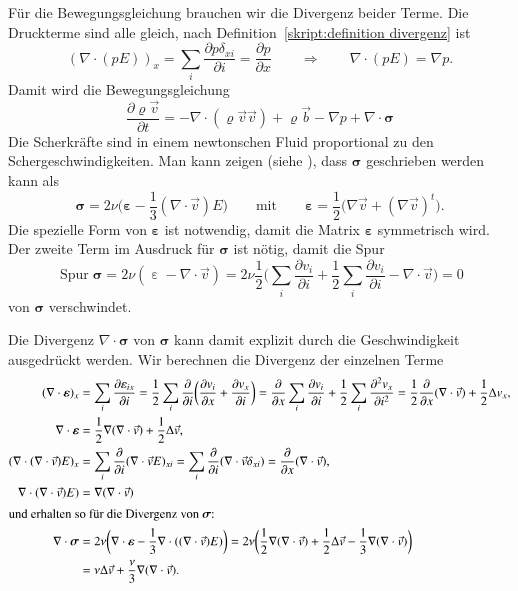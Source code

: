 Für die Bewegungsgleichung brauchen wir die Divergenz beider Terme.
Die Druckterme sind alle gleich, nach
Definition~\ref{skript:definition divergenz} ist
\[
(\nabla\cdot(pE))_x
=
\sum_i
\frac{\partial p\delta_{xi}}{\partial i}
=
\frac{\partial p}{\partial x}
\qquad\Rightarrow\qquad
\nabla\cdot(pE)
=
\nabla p.
\]
Damit wird die Bewegungsgleichung 
\begin{equation}
\frac{\partial \varrho\vec{v}}{\partial t}
=
-\nabla\cdot(\varrho\vec{v}\vec{v})
+\varrho\vec b
-\nabla p
+\nabla\cdot\bm{\sigma}
\label{skript:navier-stokes2}
\end{equation}
Die Scherkräfte sind in einem newtonschen Fluid proportional zu
den Schergeschwindigkeiten.
Man kann zeigen (siehe \cite[p.~172]{skript:kaperengler}), dass $\bm{\sigma}$
geschrieben werden kann als
\[
\bm{\sigma}
=
2\nu\biggl(\bm{\varepsilon} - \frac13(\nabla\cdot\vec{v})E\biggr)
\qquad\text{mit}\qquad
\bm{\varepsilon}=\frac12\bigl(\nabla\vec{v}+(\nabla\vec{v})^t\bigr).
\]
Die spezielle Form von $\bm{\varepsilon}$ ist notwendig, damit die Matrix
$\bm{\varepsilon}$ symmetrisch wird.
Der zweite Term im Ausdruck für $\bm{\sigma}$ ist nötig, damit die Spur
\[
\operatorname{Spur}{\bm{\sigma}}
=
2\nu(\operatorname{\varepsilon} - \nabla\cdot\vec{v})
=
2\nu
\frac12
\biggl(
\sum_i \frac{\partial v_i}{\partial i}
+
\frac12
\sum_i \frac{\partial v_i}{\partial i}
-
\nabla\cdot\vec{v}
\biggr)
=
0
\]
von $\bm{\sigma}$ verschwindet.

Die Divergenz $\nabla\cdot\bm{\sigma}$ von $\bm{\sigma}$ kann damit explizit
durch die Geschwindigkeit ausgedrückt werden.
Wir berechnen die Divergenz der einzelnen Terme
\begin{align}
(\nabla\cdot\bm{\varepsilon})_x
&=
\sum_i\frac{\partial \varepsilon_{ix}}{\partial i}
=
\frac12
\sum_i\frac{\partial}{\partial i}\biggl(
\frac{\partial v_i}{\partial x}+\frac{\partial v_x}{\partial i}
\biggr)
=
\frac{\partial}{\partial x}
\sum_i\frac{\partial v_i}{\partial i}
+
\frac12
\sum_i \frac{\partial^2 v_x}{\partial i^2}
=
\frac12\frac{\partial}{\partial x}
(\nabla\cdot\vec{v})
+
\frac12\Delta v_x,
\notag
\\
\nabla\cdot\bm{\varepsilon}
&=
\frac12\nabla(\nabla\cdot\vec{v})
+
\frac12\Delta\vec{v},
\notag
\\
(\nabla\cdot(\nabla\cdot\vec{v})E)_x
&=
\sum_i \frac{\partial}{\partial i} (\nabla\cdot\vec{v}E)_{xi}
=
\sum_i \frac{\partial}{\partial i} (\nabla\cdot\vec{v}\delta_{xi})
=
\frac{\partial}{\partial x}(\nabla\cdot\vec{v}),
\notag
\\
\nabla\cdot(\nabla\cdot\vec{v})E)
&=
\nabla(\nabla\cdot\vec v)
\notag
\\
\intertext{und erhalten so für die Divergenz von $\bm{\sigma}$:}
\nabla\cdot\bm{\sigma}
&=
2\nu\biggl(
\nabla\cdot\bm{\varepsilon}
-\frac13\nabla\cdot((\nabla\cdot\vec{v})E)
\biggr)
=
2\nu\biggl(
\frac12
\nabla(\nabla\cdot\vec{v})
+
\frac12\Delta\vec{v}
-\frac13
\nabla(\nabla\cdot\vec{v})
\biggr)
\\
&=
\nu\Delta\vec{v}
+\frac{\nu}3\nabla(\nabla\cdot\vec{v}).
\label{skript:sigmadiv}
\end{align}

